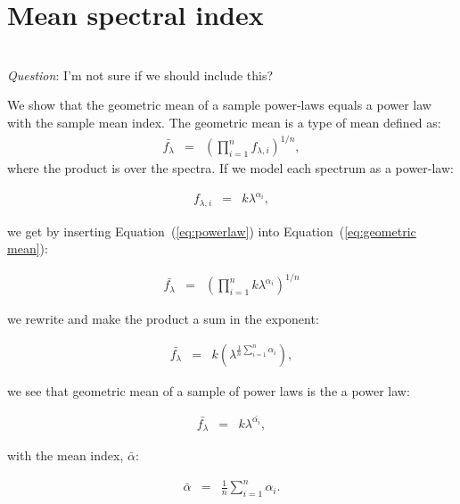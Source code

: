 \documentclass{aa}    %
\newcommand{\Eq}[1]{Equation~(\ref{eq:#1})}
\newcommand{\eq}[1]{\Eq{#1}}
\newcommand{\eqlabel}[1]{\label{eq:#1}}
\newcommand{\sectlabel}[1]{\label{sect:#1}}
\newcommand{\todo}[3]{{\color{#2}\emph{#1}: #3}}
\newcommand{\qtodo}[1]{\todo{\\ Question}{red}{#1}}
\begin{document}
%





\appendix

\section{Mean spectral index}  \sectlabel{math}

\qtodo{I'm not sure if we should include this?}

We show that the geometric mean of a sample power-laws equals a power law with the sample mean index. The geometric mean is a type of mean defined as:
\begin{eqnarray}\eqlabel{geometric mean}
\bar{f_{\lambda}} &=&  \left( \prod_{i=1}^n f_{\lambda, i} \right) ^{1/n},
\end{eqnarray}
where the product is over the spectra. If we model each spectrum as a power-law:

\begin{eqnarray}\eqlabel{powerlaw}
f_{\lambda, i} &=&  k \lambda ^{\alpha_{i}},
\end{eqnarray}

 we get by inserting \eq{powerlaw} into \eq{geometric mean}:
 
 \begin{eqnarray}\eqlabel{deriv1}
 \bar{f_{\lambda}} &=&  \left( \prod_{i=1}^n k \lambda ^{\alpha_{i}}\right) ^{1/n}
 \end{eqnarray}

we rewrite and make the product a sum in the exponent:

 \begin{eqnarray}\eqlabel{deriv2}
 \bar{f_{\lambda}} &=&  k \left( \lambda ^{ \frac{1}{n} \sum_{i=1}^n \alpha_{i}  }\right) ,
 \end{eqnarray}

we see that geometric mean of a sample of power laws is the a power law:

 \begin{eqnarray}\eqlabel{deriv3}
 \bar{f_{\lambda}} &=&  k \lambda ^{ \bar{\alpha_{i} }},
 \end{eqnarray}

with the mean index, $\bar{\alpha}$:

 \begin{eqnarray}\eqlabel{mean}
 \bar{\alpha} &=&  \frac{1}{n} \sum_{i=1}^n \alpha_{i} .
 \end{eqnarray}
\end{document}
